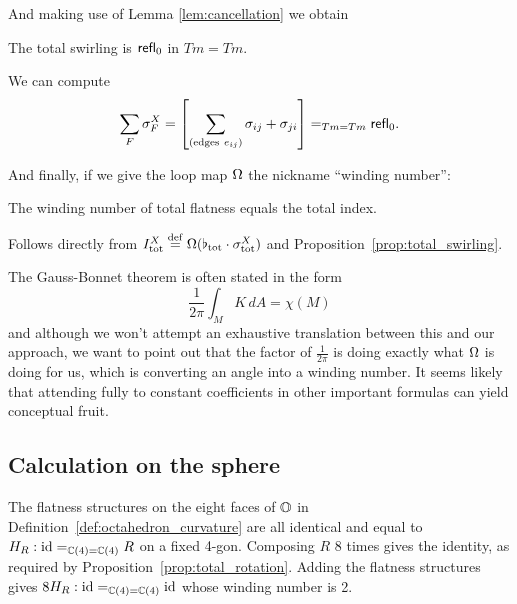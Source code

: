 And making use of Lemma \ref{lem:cancellation} we obtain
\begin{myprop}The total swirling is \( \mathsf{refl}_0 \) in \( Tm=Tm \).\label{prop:total_swirling}
\end{myprop}
\begin{myproof}We can compute
\[\sum_F\sigma^X_F=\left[\sum_{(\mathrm{edges\ }e_{ij})}\sigma_{ij}+\sigma_{ji}\right]=_{Tm=Tm}\refl_0.\]
\end{myproof}

And finally, if we give the loop map \( \Omega \) the nickname ``winding number'':

\begin{mythm}\label{thm:total_index_total_curvature}The winding number of total flatness equals the total index.
\end{mythm}
\begin{myproof}
Follows directly from \( I^X_{\mathrm{tot}}\stackrel{\mathrm{def}}{=}\Omega(\flat_{\mathrm{tot}}\cdot \sigma^X_{\mathrm{tot}}) \) and Proposition~\ref{prop:total_swirling}.
\end{myproof}

\begin{mynote}
The Gauss-Bonnet theorem is often stated in the form \[\frac{1}{2\pi}\int_M K\,dA=\chi(M)\] and although we won't attempt an exhaustive translation between this and our approach, we want to point out that the factor of \( \frac{1}{2\pi} \) is doing exactly what \( \Omega \) is doing for us, which is converting an angle into a winding number. It seems likely that attending fully to constant coefficients in other important formulas can yield conceptual fruit.
\end{mynote}

\subsection{Calculation on the sphere}
The flatness structures on the eight faces of \( \mathbb{O} \) in Definition~\ref{def:octahedron_curvature} are all identical and equal to \( H_R:\text{id}=_{\mathbb{C}(4)=\mathbb{C}(4)}R \) on a fixed 4-gon. Composing \( R \) 8 times gives the identity, as required by Proposition~\ref{prop:total_rotation}. Adding the flatness structures gives \( 8H_R:\text{id}=_{\mathbb{C}(4)=\mathbb{C}(4)}\text{id} \) whose winding number is 2.

